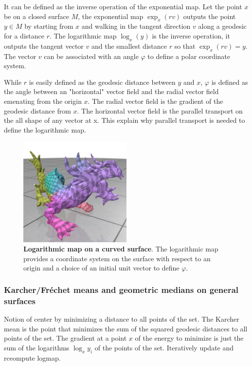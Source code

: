 \documentclass[sigconf]{acmart}
\begin{document}
It can be defined as the inverse operation of the exponential map. Let the point $x$ be on a closed surface $M$, the exponential map $\exp_x (rv)$ outputs the point $y\in M$ by starting from $x$ and walking in the tangent direction $v$ along a geodesic for a distance $r$. The logarithmic map $\log_x(y)$ is the inverse operation, it outputs the tangent vector $v$ and the smallest distance $r$ so that $\exp_x (rv)=y$. The vector $v$ can be associated with an angle $\varphi$ to define a polar coordinate system.

While $r$ is easily defined as the geodesic distance between $y$ and $x$, $\varphi$ is defined as the angle between an "horizontal" vector field and the radial vector field emenating from the origin $x$. The radial vector field is the gradient of the geodesic distance from $x$. The horizontal vector field is the parallel transport on the all shape of any vector at x. This explain why parallel transport is needed to define the logarithmic map. 

\begin{figure}[h]
  \centering
  \includegraphics[width=0.5\textwidth]{dragon_log_map.png}
  \caption{\textbf{Logarithmic map on a curved surface}. \textmd{The logarithmic map provides a coordinate system on the surface with respect to an origin and a choice of an initial unit vector to define $\varphi$.}}
  \label{fig:logarithmic_map}
\end{figure}


\subsubsection{Karcher/Fréchet means and geometric medians on general surfaces }
Notion of center by minimizing a distance to all points of the set. The Karcher mean is the point that minimizes the sum of the squared geodesic distances to all points of the set. The gradient at a point $x$ of the energy to minimize is just the sum of the logarithms $\log_x y_i$ of the points of the set. Iteratively update and rceompute logmap. 
\end{document}
